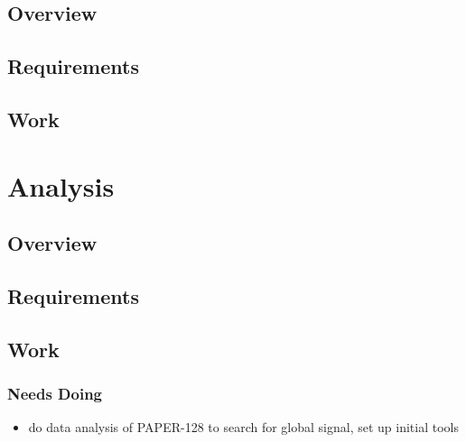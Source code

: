 \documentclass[11pt]{report}
\begin{document}
\subsection{Overview}

\subsection{Requirements}

\subsection{Work}


\section{Analysis}

\subsection{Overview}

\subsection{Requirements}

\subsection{Work}

\subsubsection{Needs Doing}
\begin{itemize}
 \item do data analysis of PAPER-128 to search for global signal, set up 
  initial tools
\end{itemize}


{}

\end{document}
